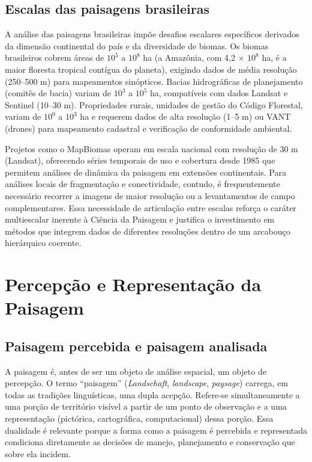 \documentclass[
  portuguese,
  11pt,
  a4paper,
  open=any]{scrbook}
\begin{document}
\section{Escalas das paisagens
brasileiras}\label{escalas-das-paisagens-brasileiras}

A análise das paisagens brasileiras impõe desafios escalares específicos
derivados da dimensão continental do país e da diversidade de biomas. Os
biomas brasileiros cobrem áreas de \(10^5\) a \(10^8\) ha (a Amazônia,
com 4,2 × \(10^8\) ha, é a maior floresta tropical contígua do planeta),
exigindo dados de média resolução (250--500 m) para mapeamentos
sinópticos. Bacias hidrográficas de planejamento (comitês de bacia)
variam de \(10^3\) a \(10^5\) ha, compatíveis com dados Landsat e
Sentinel (10--30 m). Propriedades rurais, unidades de gestão do Código
Florestal, variam de \(10^0\) a \(10^3\) ha e requerem dados de alta
resolução (1--5 m) ou VANT (drones) para mapeamento cadastral e
verificação de conformidade ambiental.

Projetos como o MapBiomas operam em escala nacional com resolução de 30
m (Landsat), oferecendo séries temporais de uso e cobertura desde 1985
que permitem análises de dinâmica da paisagem em extensões continentais.
Para análises locais de fragmentação e conectividade, contudo, é
frequentemente necessário recorrer a imagens de maior resolução ou a
levantamentos de campo complementares. Essa necessidade de articulação
entre escalas reforça o caráter multiescalar inerente à Ciência da
Paisagem e justifica o investimento em métodos que integrem dados de
diferentes resoluções dentro de um arcabouço hierárquico coerente.

\chapter{Percepção e Representação da Paisagem}\label{sec-percepcao}

\section{Paisagem percebida e paisagem
analisada}\label{paisagem-percebida-e-paisagem-analisada}

A paisagem é, antes de ser um objeto de análise espacial, um objeto de
percepção. O termo ``paisagem'' (\emph{Landschaft}, \emph{landscape},
\emph{paysage}) carrega, em todas as tradições linguísticas, uma dupla
acepção. Refere-se simultaneamente a uma porção de território visível a
partir de um ponto de observação e a uma representação (pictórica,
cartográfica, computacional) dessa porção. Essa dualidade é relevante
porque a forma como a paisagem é percebida e representada condiciona
diretamente as decisões de manejo, planejamento e conservação que sobre
ela incidem.
\end{document}
